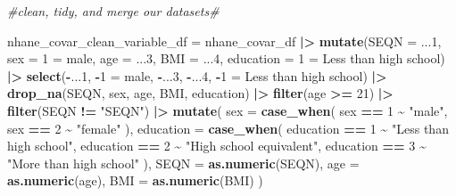 \documentclass[
]{article}
\newenvironment{Shaded}{\begin{snugshade}}{\end{snugshade}}
\newcommand{\AttributeTok}[1]{\textcolor[rgb]{0.13,0.29,0.53}{#1}}
\newcommand{\CommentTok}[1]{\textcolor[rgb]{0.56,0.35,0.01}{\textit{#1}}}
\newcommand{\DecValTok}[1]{\textcolor[rgb]{0.00,0.00,0.81}{#1}}
\newcommand{\FunctionTok}[1]{\textcolor[rgb]{0.13,0.29,0.53}{\textbf{#1}}}
\newcommand{\NormalTok}[1]{#1}
\newcommand{\OtherTok}[1]{\textcolor[rgb]{0.56,0.35,0.01}{#1}}
\newcommand{\SpecialCharTok}[1]{\textcolor[rgb]{0.81,0.36,0.00}{\textbf{#1}}}
\newcommand{\StringTok}[1]{\textcolor[rgb]{0.31,0.60,0.02}{#1}}
\begin{document}
\begin{Shaded}
\begin{Highlighting}[]
\CommentTok{\#clean, tidy, and merge our datasets\#}

\NormalTok{nhane\_covar\_clean\_variable\_df }\OtherTok{=}\NormalTok{ nhane\_covar\_df }\SpecialCharTok{|\textgreater{}} \FunctionTok{mutate}\NormalTok{(}\AttributeTok{SEQN =} \StringTok{\textasciigrave{}}\AttributeTok{...1}\StringTok{\textasciigrave{}}\NormalTok{, }\AttributeTok{sex =} \StringTok{\textasciigrave{}}\AttributeTok{1 = male}\StringTok{\textasciigrave{}}\NormalTok{,}
                                                      \AttributeTok{age =} \StringTok{\textasciigrave{}}\AttributeTok{...3}\StringTok{\textasciigrave{}}\NormalTok{, }\AttributeTok{BMI =} \StringTok{\textasciigrave{}}\AttributeTok{...4}\StringTok{\textasciigrave{}}\NormalTok{, }
                                                      \AttributeTok{education =} \StringTok{\textasciigrave{}}\AttributeTok{1 = Less than high school}\StringTok{\textasciigrave{}}\NormalTok{) }\SpecialCharTok{|\textgreater{}}
  \FunctionTok{select}\NormalTok{(}\SpecialCharTok{{-}}\StringTok{\textasciigrave{}}\AttributeTok{...1}\StringTok{\textasciigrave{}}\NormalTok{, }\SpecialCharTok{{-}}\StringTok{\textasciigrave{}}\AttributeTok{1 = male}\StringTok{\textasciigrave{}}\NormalTok{, }\SpecialCharTok{{-}}\StringTok{\textasciigrave{}}\AttributeTok{...3}\StringTok{\textasciigrave{}}\NormalTok{, }\SpecialCharTok{{-}}\StringTok{\textasciigrave{}}\AttributeTok{...4}\StringTok{\textasciigrave{}}\NormalTok{, }\SpecialCharTok{{-}}\StringTok{\textasciigrave{}}\AttributeTok{1 = Less than high school}\StringTok{\textasciigrave{}}\NormalTok{) }\SpecialCharTok{|\textgreater{}} \FunctionTok{drop\_na}\NormalTok{(SEQN, sex, age, BMI, education) }\SpecialCharTok{|\textgreater{}} \FunctionTok{filter}\NormalTok{(age }\SpecialCharTok{\textgreater{}=} \DecValTok{21}\NormalTok{) }\SpecialCharTok{|\textgreater{}} \FunctionTok{filter}\NormalTok{(SEQN }\SpecialCharTok{!=} \StringTok{"SEQN"}\NormalTok{) }\SpecialCharTok{|\textgreater{}} \FunctionTok{mutate}\NormalTok{(}
    \AttributeTok{sex =} \FunctionTok{case\_when}\NormalTok{(}
\NormalTok{      sex }\SpecialCharTok{==} \DecValTok{1} \SpecialCharTok{\textasciitilde{}} \StringTok{"male"}\NormalTok{,}
\NormalTok{      sex }\SpecialCharTok{==} \DecValTok{2} \SpecialCharTok{\textasciitilde{}} \StringTok{"female"}
\NormalTok{    ),}
    \AttributeTok{education =} \FunctionTok{case\_when}\NormalTok{(}
\NormalTok{      education }\SpecialCharTok{==} \DecValTok{1} \SpecialCharTok{\textasciitilde{}} \StringTok{"Less than high school"}\NormalTok{,}
\NormalTok{      education }\SpecialCharTok{==} \DecValTok{2} \SpecialCharTok{\textasciitilde{}} \StringTok{"High school equivalent"}\NormalTok{,}
\NormalTok{      education }\SpecialCharTok{==} \DecValTok{3} \SpecialCharTok{\textasciitilde{}} \StringTok{"More than high school"}
\NormalTok{    ),}
    \AttributeTok{SEQN =} \FunctionTok{as.numeric}\NormalTok{(SEQN), }\AttributeTok{age =} \FunctionTok{as.numeric}\NormalTok{(age), }\AttributeTok{BMI =} \FunctionTok{as.numeric}\NormalTok{(BMI)}
\NormalTok{  )}


\end{Highlighting}
\end{Shaded}
\end{document}
